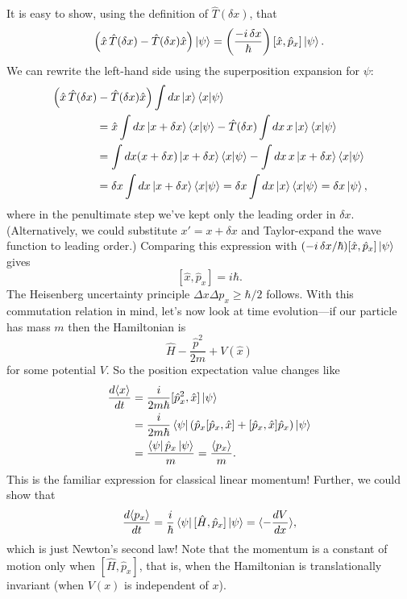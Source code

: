 \documentclass[../p116main.tex]{subfiles}
\begin{document}
It is easy to show, using the definition of $\hat T(\delta x)$, that
\[ \left( \hat x \, \hat T(\delta x) - \hat T(\delta x) \hat x \right) \left| \psi \right> = \left( \frac{-i \,\delta x}{\hbar} \right) [\hat x, \hat p_x] \left| \psi \right>. \]
We can rewrite the left-hand side using the superposition expansion for $\psi$:
\begin{align*}
    & \left( \hat x \, \hat T(\delta x) - \hat T(\delta x) \hat x \right) \int dx \left| x \right> \left< x \middle| \psi \right> \\
    &\qquad\qquad = \hat x \int dx \left| x + \delta x \right> \left< x \middle| \psi \right> - \hat T(\delta x) \int dx \, x \left| x \right> \left< x \middle| \psi \right> \\
    &\qquad\qquad = \int dx (x + \delta x) \left| x + \delta x \right> \left< x \middle| \psi \right> - \int dx \, x \left| x + \delta x \right> \left< x \middle| \psi \right> \\
    &\qquad\qquad = \delta x \int dx \left| x + \delta x \right> \left< x \middle| \psi \right> = \delta x \int dx \left| x \right> \left< x \middle| \psi \right> = \delta x \left| \psi \right>,
\end{align*}
where in the penultimate step we've kept only the leading order in $\delta x$.
(Alternatively, we could substitute $x' = x + \delta x$ and Taylor-expand the wave function to leading order.)
Comparing this expression with $(-i \, \delta x / \hbar) [\hat x, \hat p_x] \left| \psi \right>$ gives
\[ [\hat x, \hat p_x] = i\hbar. \]
The Heisenberg uncertainty principle $\Delta x \Delta p_x \geq \hbar / 2$ follows.
With this commutation relation in mind, let's now look at time evolution---if our particle has mass $m$ then the Hamiltonian is
\[ \hat H - \frac{\hat p^2}{2m} + V(\hat x) \]
for some potential $V$.
So the position expectation value changes like
\begin{align*}
    \frac{d \langle x \rangle}{dt} &= \frac{i}{2m\hbar} [\hat p_x^2, \hat x] \left| \psi \right> \\
    &= \frac{i}{2m\hbar} \left< \psi \right| \left( \hat p_x [\hat p_x, \hat x] + [\hat p_x, \hat x] \hat p_x \right) \left| \psi \right> \\
    &= \frac{\left< \psi \right| \hat p_x \left| \psi \right>}{m} = \frac{\langle p_x \rangle}{m}.
\end{align*}
This is the familiar expression for classical linear momentum!
Further, we could show that
\[ \frac{d \langle p_x \rangle}{dt} = \frac{i}{\hbar} \left< \psi \right| [\hat H, \hat p_x] \left| \psi \right> = \langle -\frac{dV}{dx} \rangle, \]
which is just Newton's second law!
Note that the momentum is a constant of motion only when $[\hat H, \hat p_x]$, that is, when the Hamiltonian is translationally invariant (when $V(x)$ is independent of $x$).
\end{document}
